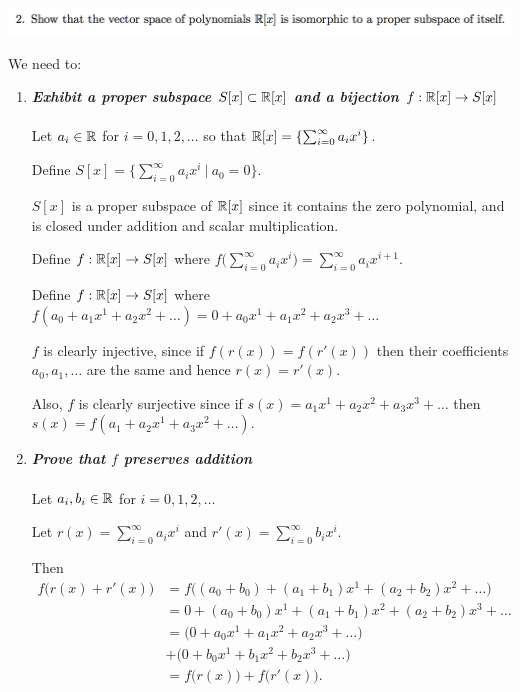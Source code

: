 \documentclass[12pt]{article}
\begin{document}
\subsection*{} %
\includegraphics[width=400pt]{img/linear-algebra-a0-1-2.png}\\
\begin{mdframed}
We need to:
\begin{enumerate}
\item \textbf{\textit{Exhibit a proper subspace $S[x] \subset \mathbb{R}[x]$ and a bijection $f:\mathbb{R}[x] \to S[x]$}}\\\\
  Let $a_i \in \mathbb{R}$ for $i = 0, 1, 2, \ldots$ so that
  $\mathbb{R}[x] = \{\sum_{i=0}^\infty a_ix^i\}$.

  Define $S[x] = \{\sum_{i=0}^\infty a_ix^i ~|~a_0 = 0\}$.

  $S[x]$ is a proper subspace of $\mathbb{R}[x]$ since it contains the zero polynomial,
  and is closed under addition and scalar multiplication.

  Define $f: \mathbb{R}[x] \to S[x]$ where
  $f\Big(\sum_{i=0}^\infty a_ix^i\Big) = \sum_{i=0}^\infty a_ix^{i+1}$.

  Define $f: \mathbb{R}[x] \to S[x]$ where
  $f(a_0 + a_1x^1 + a_2x^2 + \ldots) = 0 + a_0x^1 + a_1x^2 + a_2x^3 + \ldots$

  $f$ is clearly injective, since if $f(r(x)) = f(r'(x))$ then their
  coefficients $a_0, a_1, \ldots$ are the same and hence $r(x) = r'(x)$.

  Also, $f$ is clearly surjective since if
  $s(x) = a_1x^1 + a_2x^2 + a_3x^3 + \ldots$ then
  $s(x) = f(a_1 + a_2x^1 + a_3x^2 + \ldots)$.

\item \textbf{\textit{Prove that $f$ preserves addition}}\\\\
  Let $a_i,b_i \in \mathbb{R}$ for $i = 0, 1, 2, \ldots$

  Let $r(x) = \sum_{i=0}^\infty a_ix^i$ and $r'(x) = \sum_{i=0}^\infty b_ix^i$.

  Then
  \begin{align*}
    f\Big(r(x) + r'(x)\Big)
    &= f\Big((a_0 + b_0) + (a_1 + b_1)x^1 + (a_2 + b_2)x^2 + \ldots\Big)\\
    &= 0 + (a_0 + b_0)x^1 + (a_1 + b_1)x^2 + (a_2 + b_2)x^3 + \ldots\\
    &= \Big(0 + a_0x^1 + a_1x^2 + a_2x^3 + \ldots \Big) \\
    &+ \Big(0 + b_0x^1 + b_1x^2 + b_2x^3 + \ldots \Big) \\
    &= f\Big(r(x)\Big) + f\Big(r'(x)\Big).
  \end{align*}


\end{enumerate}
\end{mdframed}
\end{document}
